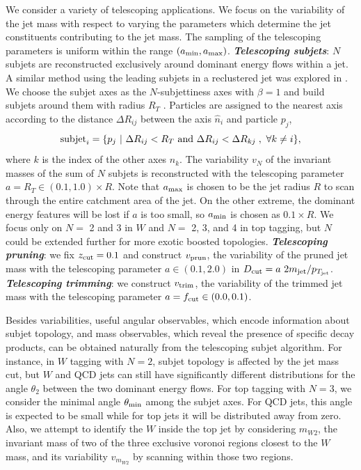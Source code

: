 \documentclass[aps,prl,floatfix,preprintnumbers,twocolumn,groupedaddress,nofootinbib]{revtex4-1}
\begin{document}
We consider a variety of telescoping applications. We focus on the variability of the jet mass with respect to varying the parameters which determine the jet constituents contributing to the jet mass. The sampling of the telescoping parameters is uniform within the range $(a_{\rm min},a_{\rm max})$.
\newline \noindent \textit{\textbf{Telescoping subjets}}: $N$ subjets are reconstructed exclusively around dominant energy flows within a jet. A similar method using the leading subjets in a reclustered jet was explored in \cite{Cui:2010km}. We choose the subjet axes as the $N$-subjettiness axes \cite{Thaler:2010tr} with $\beta = 1$ and build subjets around them with radius $R_T$ \cite{Stewart:2010tn,Chien:2013kca,Stewart:2015waa,Thaler:2015xaa}. Particles are assigned to the nearest axis according to the distance $\Delta R_{ij}$ between the axis $\hat n_i$ and particle $p_j$,
\begin{equation}
    {\rm subjet}_{i} = \{p_j~|~\Delta R_{ij}<R_T~{\rm and}~\Delta R_{ij}<\Delta R_{kj}\;,~\forall k\neq i\},
\end{equation}
where $k$ is the index of the other axes $\hat n_k$. The variability $v_N$ of the invariant masses of the sum of $N$ subjets is reconstructed with the telescoping parameter $a = R_{T}\in (0.1, 1.0)\times R$. Note that $a_{\rm max}$ is chosen to be the jet radius $R$ to scan through the entire catchment area of the jet. On the other extreme, the dominant energy features will be lost if $a$ is too small, so $a_{\rm min}$ is chosen as $0.1\times R$. We focus only on $N = $ 2 and 3 in $W$ and $N = $ 2, 3, and 4 in top tagging, but $N$ could be extended further for more exotic boosted topologies. %
\newline \noindent \textit{\textbf{Telescoping pruning}}: we fix $z_{\rm cut}=0.1$ and construct $v_{\rm prun}$, the variability of the pruned jet mass with the telescoping parameter $a\in (0.1, 2.0)$ in $D_{\rm cut} = a~ 2m_{\rm jet}/p_{T_{\rm jet}}$. 
\newline \noindent \textit{\textbf{Telescoping trimming}}: we construct $v_{\rm trim}$, the variability of the trimmed jet mass with the telescoping parameter $a = f_{\rm cut} \in (0.0, 0.1)$.

Besides variabilities, useful angular observables, which encode information about subjet topology, and mass observables, which reveal the presence of specific decay products, can be obtained naturally from the telescoping subjet algorithm. For instance, in $W$ tagging with $N=2$, subjet topology is affected by the jet mass cut, but $W$ and QCD jets can still have significantly different distributions for the angle $\theta_2$ between the two dominant energy flows. For top tagging with $N=3$, we consider the minimal angle $\theta_{\rm min}$ among the subjet axes. For QCD jets, this angle is expected to be small while for top jets it will be distributed away from zero. Also, we attempt to identify the $W$ inside the top jet \cite{Thaler:2008ju,Kaplan:2008ie} by considering \textbf{$m_{W2}$}, the invariant mass of two of the three exclusive voronoi regions closest to the $W$ mass, and its variability $v_{m_{W2}}$ by scanning within those two regions.
\end{document}
